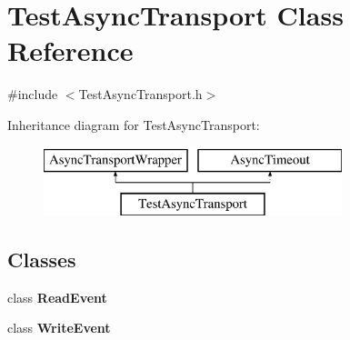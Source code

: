 \section{Test\+Async\+Transport Class Reference}
\label{classTestAsyncTransport}


{\ttfamily \#include $<$Test\+Async\+Transport.\+h$>$}

Inheritance diagram for Test\+Async\+Transport\+:\begin{figure}[H]
\begin{center}
\leavevmode
\includegraphics[height=2.000000cm]{classTestAsyncTransport}
\end{center}
\end{figure}
\subsection*{Classes}
\begin{DoxyCompactItemize}
\item 
class {\bf Read\+Event}
\item 
class {\bf Write\+Event}
\end{DoxyCompactItemize}
